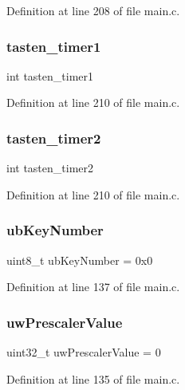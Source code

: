 Definition at line 208 of file main.\+c.

\mbox{\label{main_8c_a521eebae31b5caa60670004372a6800f}} 
\subsubsection{tasten\+\_\+timer1}
{\footnotesize\ttfamily int tasten\+\_\+timer1}



Definition at line 210 of file main.\+c.

\mbox{\label{main_8c_a88188054401cd50a2c0b9554c796c9e7}} 
\subsubsection{tasten\+\_\+timer2}
{\footnotesize\ttfamily int tasten\+\_\+timer2}



Definition at line 210 of file main.\+c.

\mbox{\label{main_8c_a71fa247395666f7311985d94c14a09cb}} 
\subsubsection{ub\+Key\+Number}
{\footnotesize\ttfamily uint8\+\_\+t ub\+Key\+Number = 0x0}



Definition at line 137 of file main.\+c.

\mbox{\label{main_8c_aa75159f0bc608fa3238e2c413de653ff}} 
\subsubsection{uw\+Prescaler\+Value}
{\footnotesize\ttfamily uint32\+\_\+t uw\+Prescaler\+Value = 0}



Definition at line 135 of file main.\+c.

\mbox{\label{main_8c_ac75b803b570527306e1e744bfb7a604f}} 
